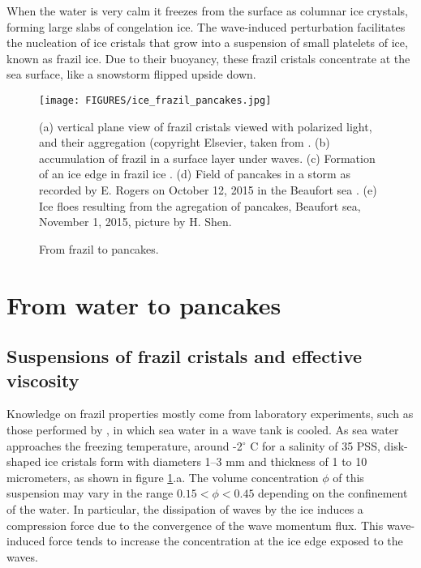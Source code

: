 When the water is very calm it freezes from the surface as columnar ice crystals, forming large slabs of congelation ice. The wave-induced perturbation facilitates the nucleation of ice cristals that grow into a suspension of small platelets of ice, known as frazil ice.  Due to their buoyancy, these frazil cristals concentrate at the sea surface, like a snowstorm flipped upside down. 

\begin{figure}[htb]
\centerline{\texttt{[image: FIGURES/ice\_frazil\_pancakes.jpg]}}
  \caption{From frazil to pancakes.}{(a) vertical plane view of frazil cristals viewed with polarized light, and their aggregation (copyright Elsevier, taken from \cite{McFarlane&al.2015}. (b) accumulation of frazil in a surface layer under waves. (c) Formation of an ice edge in frazil ice \citep[From][, copyright Cambridge University Press]{Martin&Kauffman1981}. (d) Field of pancakes in a storm as recorded by E. Rogers on October 12, 2015 in the Beaufort sea \citep{Rogers&al.2016}. (e) Ice floes resulting from the agregation of pancakes, Beaufort sea, November 1, 2015, picture by H. Shen.} \label{fig:frazil_pancakes}
\end{figure}


\section{From water to pancakes}
\subsection{Suspensions of frazil cristals and effective viscosity}
Knowledge on frazil properties mostly come from laboratory experiments, such as those performed by  \cite{Martin&Kauffman1981}, in which sea water in a wave tank is cooled. As sea water approaches the freezing temperature, around -2$^\circ$ C for a salinity of 35 PSS, disk-shaped ice cristals form with diameters 1--3 mm and thickness of 1 to 10 micrometers, as shown in figure \ref{fig:frazil_pancakes}.a. The volume concentration $\phi$ of this suspension may vary in the range  $0.15<\phi<0.45$ depending on the confinement of the water. In particular, the dissipation of waves by the ice induces a compression force due to the convergence of the wave momentum flux. This wave-induced force tends to increase the concentration at the ice edge exposed to the waves. 

